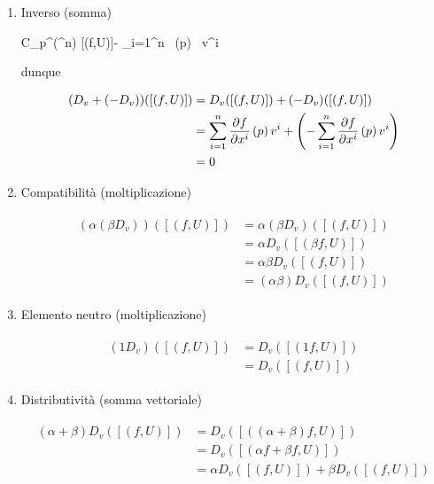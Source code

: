 \begin{enumerate}
	\item Inverso (somma)
	
		{C_{p}^{\infty}(\R^{n})}{\R}
		{[(f,U)]}{- \sum_{i=1}^{n}  \, (p) \, v^{i}}
	
	dunque
	
	\begin{align}
		\begin{split}
			(D_{v} + (- D_{v})) ([(f,U)]) &= D_{v} ([(f,U)]) + (- D_{v}) ([(f,U)])\\
			&= \sum_{i=1}^{n} \pdv{f}{x^{i}} \, (p) \, v^{i} + \left( - \sum_{i=1}^{n} \pdv{f}{x^{i}} \, (p) \, v^{i} \right)\\
			&= 0
		\end{split}
	\end{align}
	
	\item Compatibilità (moltiplicazione)
	
	\begin{align}
		\begin{split}
			(\alpha (\beta D_{v})) ([(f,U)]) &= \alpha (\beta D_{v}) ([(f,U)])\\
			&= \alpha D_{v} ([(\beta f,U)])\\
			&= \alpha \beta D_{v} ([(f,U)])\\
			&= (\alpha \beta) D_{v} ([(f,U)])
		\end{split}
	\end{align}
	
	\item Elemento neutro (moltiplicazione)
	
	\begin{align}
		\begin{split}
			(1 D_{v}) ([(f,U)]) &= D_{v} ([(1 f,U)])\\
			&= D_{v} ([(f,U)])
		\end{split}
	\end{align}
	
	\item Distributività (somma vettoriale)
	
	\begin{align}
		\begin{split}
			(\alpha + \beta) D_{v} ([(f,U)]) &= D_{v} ([((\alpha + \beta) f,U)])\\
			&= D_{v} ([(\alpha f + \beta f,U)])\\
			&= \alpha D_{v} ([(f,U)]) + \beta D_{v} ([(f,U)])\\
		\end{split}
	\end{align}
	

\end{enumerate}
